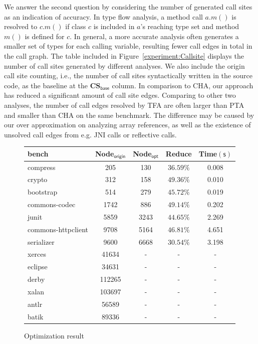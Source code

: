 \documentclass{llncs}
\begin{document}
We answer the second question by considering the number of generated call sites as an indication of accuracy. In type flow analysis, a method call $a.m()$ is resolved to $c.m()$ if class $c$ is included in $a$'s reaching type set and method $m()$ is defined for $c$. In general, a more accurate analysis often generates a smaller set of types for each calling variable, resulting fewer call edges in total in the call graph. The table included in Figure~\ref{experiment:Callsite} displays the number of call sites generated by different analyses. We also include the origin call site counting, i.e., the number of call sites syntactically written in the source code, as the baseline at the \textbf{CS$_{\textsf{base}}$} column. In comparison to CHA, our approach has reduced a significant amount of call site edges.
Comparing to other two analyses, the number of call edges resolved by TFA are often larger than PTA and smaller than CHA on the same benchmark. The difference may be caused by our over approximation on analyzing array references, as well as the existence of unsolved call edges from e.g. JNI calls or reflective calls.


\begin{figure}[t!]
  \centering
\begin{tabular}{lcccc}
	\hline
	\textbf{bench} & \textbf{Node$_{\textsf{origin}}$} & \textbf{Node$_{\textsf{opt}}$} & \textbf{Reduce} & \hspace{2pt}\textbf{Time$(\textsf{s})$} \\
	\hline
	compress & 205 & 130 & $36.59\%$ & 0.008 \\
	crypto & 312 & 158 & $49.36\%$ & 0.010 \\
	bootstrap & 514 & 279 & $45.72\%$ & 0.019 \\
	commons-codec & 1742 & 886 & $49.14\%$ & 0.202 \\
	junit & 5859 & 3243 & $44.65\%$ & 2.269 \\
	commons-httpclient & 9708 & 5164 & $46.81\%$ & 4.651 \\
	serializer & 9600 & 6668 & $30.54\%$ & 3.198 \\
	xerces & 41634 & - & - & -\\
	eclipse & 34631 & - & - & -\\
	derby & 112265 & - & - & -\\
	xalan & 103697 & - & - & -\\
	antlr & 56589 & - & - & -\\
	batik & 89336 & - & - & -\\
	\hline
\end{tabular}
\caption{Optimization result}
\label{experiment:Optimalization}
\end{figure}
\end{document}
